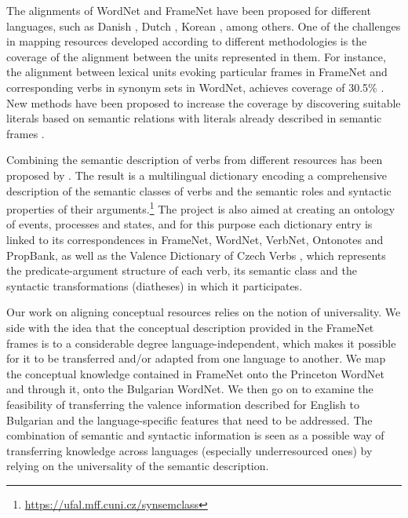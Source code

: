 \documentclass[output=paper,colorlinks,citecolor=brown]{langscibook}
\begin{document}
The alignments of WordNet and FrameNet have been proposed for different languages, such as Danish \citep{pedersen-etal-2018-danish}, Dutch \citep{Horak2008TheDO}, Korean \citep{Gilardi2018LearningTA}, among others. One of the challenges in mapping resources developed according to different methodologies is the coverage of the alignment between the units represented in them. For instance, the alignment between lexical units evoking particular frames in FrameNet and corresponding verbs in synonym sets in WordNet, achieves coverage of 30.5\% \citep{Stoyanova2019}. New methods have been proposed to increase the coverage by discovering suitable literals based on semantic relations with literals already described in semantic frames \citep{Burchardt2005}.  

Combining the semantic description of verbs from different resources has been proposed by \citet{Uresova2020a,Uresova2020b}. The result is a multilingual dictionary encoding a comprehensive description of the semantic classes of verbs and the semantic roles and syntactic properties of their arguments.\footnote{\url{https://ufal.mff.cuni.cz/synsemclass}} The project is also aimed at creating an ontology of events, processes and states, and for this purpose each dictionary entry is linked to its correspondences in FrameNet, WordNet, VerbNet, Ontonotes and PropBank, as well as the Valence Dictionary of Czech Verbs \citep{Lopatkova2016}, which represents the predicate-argument structure of each verb, its semantic class and the syntactic transformations (diatheses) in which it participates.


Our work on aligning conceptual resources relies on the notion of universality. We side with the idea that the conceptual description provided in the FrameNet frames is to a considerable degree language-independent, which makes it possible for it to be transferred and/or adapted from one language to another. We map the conceptual knowledge contained in FrameNet onto the Princeton WordNet and through it, onto the Bulgarian WordNet. We then go on to examine the feasibility of transferring the valence information %
described for English to Bulgarian and the language-specific features that need to be addressed. The combination of semantic and syntactic information is seen as a possible way of transferring knowledge across languages (especially underresourced ones) by relying on the universality of the semantic description. 
\end{document}
